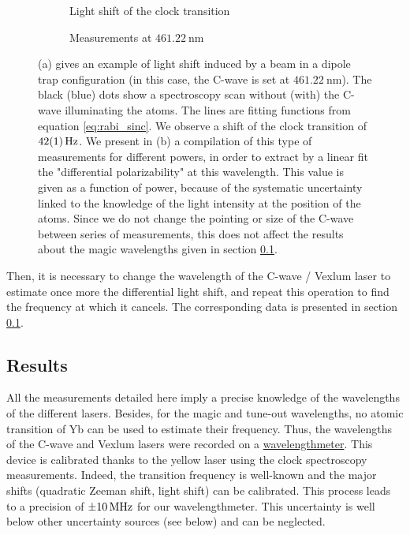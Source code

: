 \documentclass[11pt]{article}
\numberwithin{equation}{section}
\numberwithin{figure}{section}
\begin{document}
%
\begin{figure}[htbp]
	\centering
	\begin{subfigure}[b]{0.48\textwidth}
		\centering
		\small
   		
		\caption{\small Light shift of the clock transition}
		\label{fig:light_shift_ex}
	\end{subfigure}
	\begin{subfigure}[b]{0.48\textwidth}
    	\centering
    	\small
   		
		\caption{\small Measurements at $\SI{461.22}{\nano\metre}$}
		\label{fig:light_shift_total}
	\end{subfigure}	
	\caption{\small (a) gives an example of light shift induced by a beam in a dipole trap configuration (in this case, the C-wave is set at $\SI{461.22}{\nano\metre}$). The black (blue) dots show a spectroscopy scan without (with) the C-wave illuminating the atoms. The lines are fitting functions from equation \eqref{eq:rabi_sinc}. We observe a shift of the clock transition of $\SI{42\pm1}{\hertz}$. We present in (b) a compilation of this type of measurements for different powers, in order to extract by a linear fit the "differential polarizability" at this wavelength. This value is given as a function of power, because of the systematic uncertainty linked to the knowledge of the light intensity at the position of the atoms. Since we do not change the pointing or size of the C-wave between series of measurements, this does not affect the results about the magic wavelengths given in section \ref{sec:results}.}
    \label{fig:light_shift}
\end{figure}
%

Then, it is necessary to change the wavelength of the C-wave / Vexlum laser to estimate once more the differential light shift, and repeat this operation to find the frequency at which it cancels. The corresponding data is presented in section \ref{sec:results}.

\subsection{Results}
\label{sec:results}

All the measurements detailed here imply a precise knowledge of the wavelengths of the different lasers. Besides, for the magic and tune-out wavelengths, no atomic transition of Yb can be used to estimate their frequency. Thus, the wavelengths of the C-wave and Vexlum lasers were recorded on a \href{https://www.highfinesse.com/en/wavelengthmeter/wavelengthmeter-ws-8-2.html}{wavelengthmeter}. This device is calibrated thanks to the yellow laser using the clock spectroscopy measurements. Indeed, the transition frequency is well-known \citep{2008_poli} and the major shifts (quadratic Zeeman shift, light shift) can be calibrated. This process leads to a precision of $\SI{\pm10}{\mega\hertz}$ for our wavelengthmeter. This uncertainty is well below other uncertainty sources (see below) and can be neglected.
\end{document}
